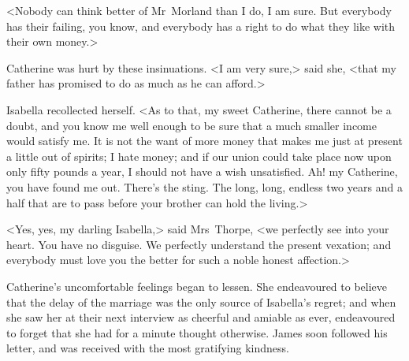  <Nobody can think better of Mr~Morland than I do, I am sure. But everybody has their failing, you know, and everybody has a right to do what they like with their own money.> 

 Catherine was hurt by these insinuations. <I am very sure,> said she, <that my father has promised to do as much as he can afford.> 

 Isabella recollected herself. <As to that, my sweet Catherine, there cannot be a doubt, and you know me well enough to be sure that a much smaller income would satisfy me. It is not the want of more money that makes me just at present a little out of spirits; I hate money; and if our union could take place now upon only fifty pounds a year, I should not have a wish unsatisfied. Ah! my Catherine, you have found me out. There's the sting. The long, long, endless two years and a half that are to pass before your brother can hold the living.> 

 <Yes, yes, my darling Isabella,> said Mrs~Thorpe, <we perfectly see into your heart. You have no disguise. We perfectly understand the present vexation; and everybody must love you the better for such a noble honest affection.> 

 Catherine's uncomfortable feelings began to lessen. She endeavoured to believe that the delay of the marriage was the only source of Isabella's regret; and when she saw her at their next interview as cheerful and amiable as ever, endeavoured to forget that she had for a minute thought otherwise. James soon followed his letter, and was received with the most gratifying kindness. 
